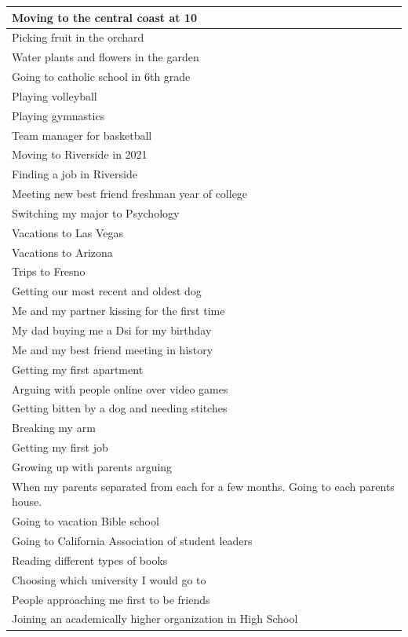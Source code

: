 \documentclass[
  .7em,
  letterpaper,
  DIV=11,
  numbers=noendperiod]{scrartcl}
\begin{document}
\begin{table}
\begin{tabular}{l}
\hline
Moving to the central coast at 10\\
\hline
Picking fruit in the orchard\\
\hline
Water plants and flowers in the garden\\
\hline
Going to catholic school in 6th grade\\
\hline
Playing volleyball\\
\hline
Playing gymnastics\\
\hline
Team manager for basketball\\
\hline
Moving to Riverside in 2021\\
\hline
Finding a job in Riverside\\
\hline
Meeting new best friend freshman year of college\\
\hline
Switching my major to Psychology\\
\hline
Vacations to Las Vegas\\
\hline
Vacations to Arizona\\
\hline
Trips to Fresno\\
\hline
Getting our most recent and oldest dog\\
\hline
Me and my partner kissing for the first time\\
\hline
My dad buying me a Dsi for my birthday\\
\hline
Me and my best friend meeting in history\\
\hline
Getting my first apartment\\
\hline
Arguing with people online over video games\\
\hline
Getting bitten by a dog and needing stitches\\
\hline
Breaking my arm\\
\hline
Getting my first job\\
\hline
Growing up with parents arguing\\
\hline
When my parents separated from each for a few months. Going to each parents house.\\
\hline
Going to vacation Bible school\\
\hline
Going to California Association of student leaders\\
\hline
Reading different types of books\\
\hline
Choosing which university I would go to\\
\hline
People approaching me first to be friends\\
\hline
Joining an academically higher organization in High School\\

\end{tabular}
\end{table}
\end{document}
